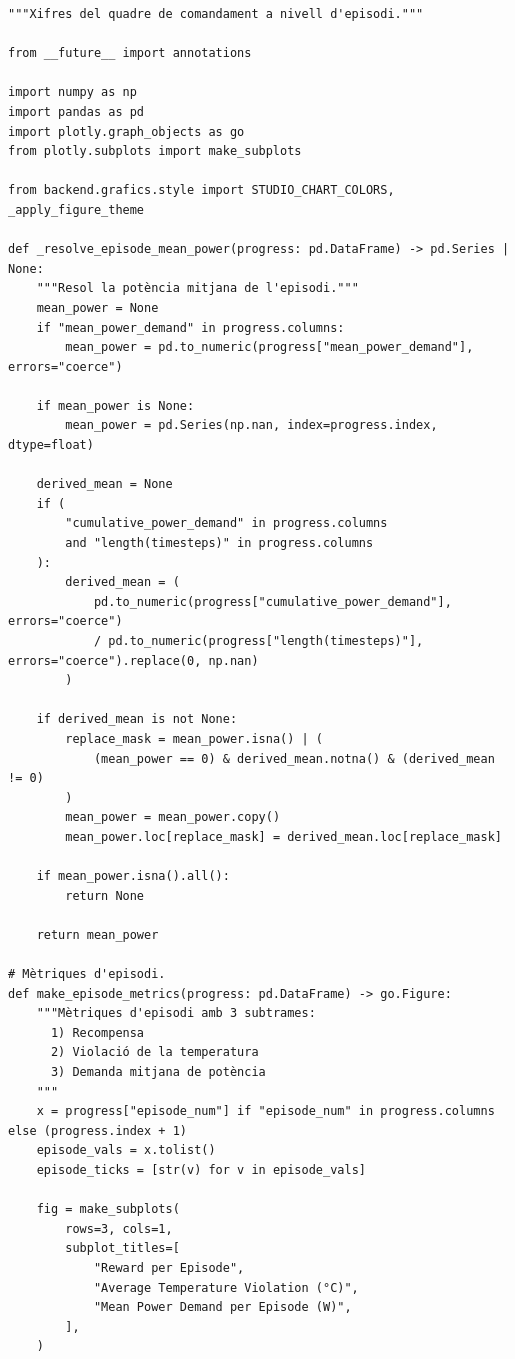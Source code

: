 \documentclass[10pt,a4paper]{article}
\begin{document}
\begin{lstlisting}[style=studioPython,caption={backend/grafics/episode.py},label={lst:backend-grafics-episode-py}]
"""Xifres del quadre de comandament a nivell d'episodi."""

from __future__ import annotations

import numpy as np
import pandas as pd
import plotly.graph_objects as go
from plotly.subplots import make_subplots

from backend.grafics.style import STUDIO_CHART_COLORS, _apply_figure_theme

def _resolve_episode_mean_power(progress: pd.DataFrame) -> pd.Series | None:
    """Resol la potència mitjana de l'episodi."""
    mean_power = None
    if "mean_power_demand" in progress.columns:
        mean_power = pd.to_numeric(progress["mean_power_demand"], errors="coerce")

    if mean_power is None:
        mean_power = pd.Series(np.nan, index=progress.index, dtype=float)

    derived_mean = None
    if (
        "cumulative_power_demand" in progress.columns
        and "length(timesteps)" in progress.columns
    ):
        derived_mean = (
            pd.to_numeric(progress["cumulative_power_demand"], errors="coerce")
            / pd.to_numeric(progress["length(timesteps)"], errors="coerce").replace(0, np.nan)
        )

    if derived_mean is not None:
        replace_mask = mean_power.isna() | (
            (mean_power == 0) & derived_mean.notna() & (derived_mean != 0)
        )
        mean_power = mean_power.copy()
        mean_power.loc[replace_mask] = derived_mean.loc[replace_mask]

    if mean_power.isna().all():
        return None

    return mean_power

# Mètriques d'episodi.
def make_episode_metrics(progress: pd.DataFrame) -> go.Figure:
    """Mètriques d'episodi amb 3 subtrames:
      1) Recompensa
      2) Violació de la temperatura
      3) Demanda mitjana de potència
    """
    x = progress["episode_num"] if "episode_num" in progress.columns else (progress.index + 1)
    episode_vals = x.tolist()
    episode_ticks = [str(v) for v in episode_vals]

    fig = make_subplots(
        rows=3, cols=1,
        subplot_titles=[
            "Reward per Episode",
            "Average Temperature Violation (°C)",
            "Mean Power Demand per Episode (W)",
        ],
    )


\end{lstlisting}
\end{document}
